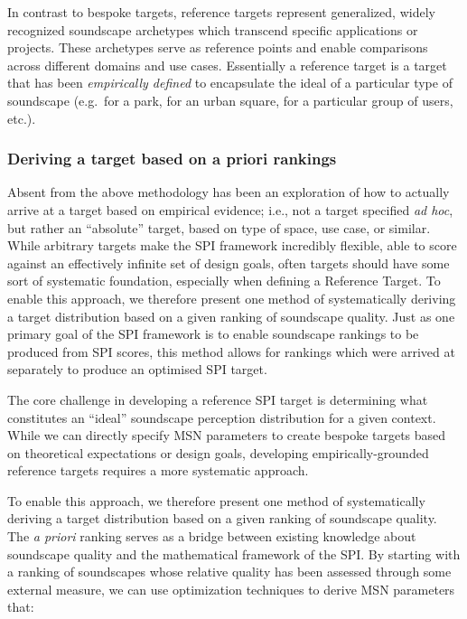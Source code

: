 \documentclass[
  authoryear,
  3p]{elsarticle}
\begin{document}
In contrast to bespoke targets, reference targets represent generalized,
widely recognized soundscape archetypes which transcend specific
applications or projects. These archetypes serve as reference points and
enable comparisons across different domains and use cases. Essentially a
reference target is a target that has been \emph{empirically defined} to
encapsulate the ideal of a particular type of soundscape (e.g.~for a
park, for an urban square, for a particular group of users, etc.).

\subsubsection{Deriving a target based on a priori
rankings}\label{sec-targets}

Absent from the above methodology has been an exploration of how to
actually arrive at a target based on empirical evidence; i.e., not a
target specified \emph{ad hoc}, but rather an ``absolute'' target, based
on type of space, use case, or similar. While arbitrary targets make the
SPI framework incredibly flexible, able to score against an effectively
infinite set of design goals, often targets should have some sort of
systematic foundation, especially when defining a Reference Target. To
enable this approach, we therefore present one method of systematically
deriving a target distribution based on a given ranking of soundscape
quality. Just as one primary goal of the SPI framework is to enable
soundscape rankings to be produced from SPI scores, this method allows
for rankings which were arrived at separately to produce an optimised
SPI target.

The core challenge in developing a reference SPI target is determining
what constitutes an ``ideal'' soundscape perception distribution for a
given context. While we can directly specify MSN parameters to create
bespoke targets based on theoretical expectations or design goals,
developing empirically-grounded reference targets requires a more
systematic approach.

To enable this approach, we therefore present one method of
systematically deriving a target distribution based on a given ranking
of soundscape quality. The \emph{a priori} ranking serves as a bridge
between existing knowledge about soundscape quality and the mathematical
framework of the SPI. By starting with a ranking of soundscapes whose
relative quality has been assessed through some external measure, we can
use optimization techniques to derive MSN parameters that:
\end{document}
